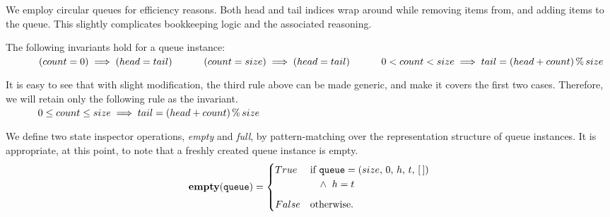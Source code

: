 \documentclass[10pt]{article}
\begin{document}
    We employ circular queues for efficiency reasons. Both head and tail indices wrap around while removing items from, and adding items to the queue. This slightly complicates bookkeeping logic and the associated reasoning. 

    \noindent The following invariants hold for a queue instance:\vspace*{6pt}\\
    \(
        \hspace*{32pt}(count = 0) \implies (head = tail)\vspace*{6pt}\\
        \hspace*{32pt}(count = size) \implies (head = tail)\vspace*{8pt}\\
        \hspace*{32pt}0 < count < size \implies tail = (head + count) \,\%\, size \\
    \)%

    \noindent It is easy to see that with slight modification, the third rule above can be made generic, and make it covers the first two cases. Therefore, we will retain only the following rule as the invariant.\vspace*{6pt}\\
    \(
        \hspace*{32pt}0 \leq count \leq size \implies tail = (head + count) \,\%\, size \\
    \)
    
    We define two state inspector operations, \emph{empty} and \emph{full}, by pattern-matching over the representation structure of queue instances. It is appropriate, at this point, to note that a freshly created queue instance is empty.
    \vspace*{3pt}\\
    \[
        \mathtt{\mathbf{empty}(queue)} = \begin{cases} True & \mbox{if  } \mathtt{queue} = (size, \, 0, \, h, \, t, \, [\,])\\
        &\hspace*{10pt}\wedge\;\; h = t \vspace*{6pt}\\ 
        False & \mbox{otherwise}. \end{cases} 
    \]
\end{document}

